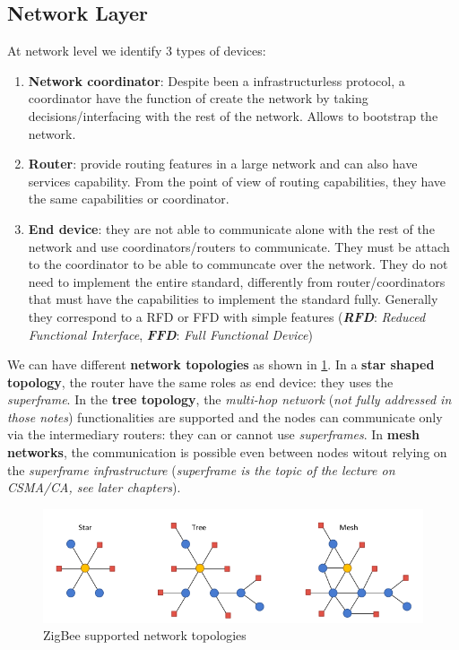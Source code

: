 \documentclass[10pt,a4paper]{report}
\theoremstyle{definition}
\begin{document}
\subsection{Network Layer}\label{sec:network-layer}
At network level we identify 3 types of devices:
\begin{enumerate}
	\item 
	\textbf{Network coordinator}: Despite been a infrastructurless protocol, a coordinator have the function of create the network by taking decisions/interfacing with the rest of the network. Allows to bootstrap the network.
	\item 
	\textbf{Router}: provide routing features in a large network and can also have services capability. From the point of view of routing capabilities, they have the same capabilities or coordinator.
	\item 
	\textbf{End device}: they are not able to communicate alone with the rest of the network and use coordinators/routers to communicate. They must be attach to the coordinator to be able to communcate over the network. They do not need to implement the entire standard, differently from router/coordinators that must have the capabilities to implement the standard fully. Generally they correspond to a RFD or FFD with simple features (\textit{\textbf{RFD}}: \textit{Reduced Functional Interface}, \textit{\textbf{FFD}}: \textit{Full Functional Device})
\end{enumerate}
We can have different \textbf{network topologies} as shown in \ref{net-topologies}.
In a \textbf{star shaped topology}, the router have the same roles as end device: they uses the \textit{superframe}. In the \textbf{tree topology}, the \textit{multi-hop network} (\textit{not fully addressed in those notes}) functionalities are supported and the nodes can communicate only via the intermediary routers: they can or cannot use \textit{superframes}. In \textbf{mesh networks}, the communication is possible even between nodes witout relying on the \textit{superframe infrastructure} (\textit{superframe is the topic of the lecture on CSMA/CA, see later chapters}).

\begin{figure}[h]
	\centering\includegraphics[scale=0.50]{images/Pasted image 20230307164039.png}
	\caption{ZigBee supported network topologies}
	\label{net-topologies}
\end{figure}
\end{document}
